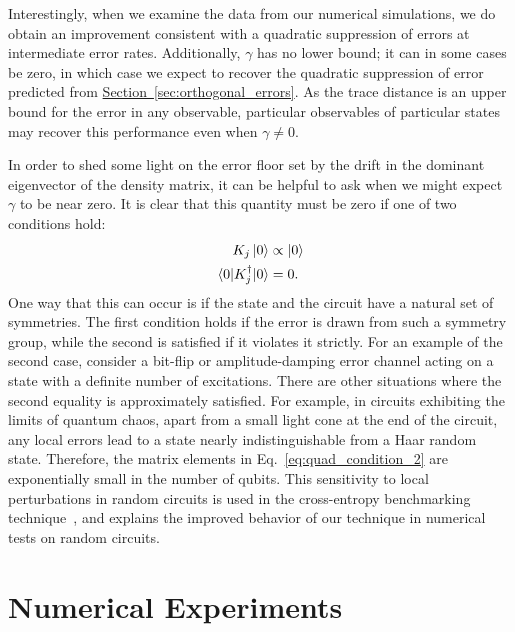 \documentclass[
amsmath,
amssymb,
aps,
pra,
reprint,
twocolumn,
superscriptaddress,
longbibliography,
showkeys,
floatfix
]{revtex4-1}
\newcommand{\replace}[2]{#2}
\def\ket#1{\ensuremath{\mathinner{|{#1}\rangle}}}
\renewcommand{\sec}[1]{\hyperref[sec:#1]{Section~\ref*{sec:#1}}}
\begin{document}
Interestingly, when we examine the data from our numerical simulations, we do
obtain an improvement consistent with a quadratic suppression of errors at
intermediate error rates.
Additionally, \(\gamma\) has no lower bound;
it can in some cases be zero, in which case we expect to recover the quadratic
suppression of error predicted from \sec{orthogonal_errors}.
As the trace distance is an upper bound for the error in any observable,
particular observables of particular states may recover this performance even
when \(\gamma \neq 0\).

In order to shed some light on the error floor set by the drift in the dominant eigenvector of the density matrix, it can be helpful to ask when we might expect \(\gamma\) to be near zero.
It is clear that this quantity must be zero if \replace{
\(K_j\ket{0} \propto \ket{0}\) or \(\ev{K_j^\dagger}{0} = 0\) for all \(j\).}{one of two conditions hold:}
\begin{align}
    K_j\ket{0} &\propto \ket{0}\label{eq:quad_condition_1}\\
    \ev{K_j^\dagger}{0} &= 0\label{eq:quad_condition_2}.
\end{align}
One way that this can occur is if the state and the circuit have a natural set of symmetries. The first condition holds if the error is drawn from such a symmetry group, while the second is satisfied if it violates it strictly.
For an example of the second case, consider a bit-flip or amplitude-damping error channel acting on a state
with a definite number of excitations. 
There are other situations where the second equality is approximately satisfied.  For example, in circuits
exhibiting the limits of quantum chaos, apart from a small light cone at the end of the circuit, any local errors lead to a state nearly indistinguishable from a Haar random state. Therefore, the matrix elements in \replace{the second condition}{Eq.~\ref{eq:quad_condition_2}} are exponentially small in the number of qubits.
This sensitivity to local perturbations in random circuits is used in the cross-entropy benchmarking technique~\cite{Arute2019-jy}, and explains the improved behavior of our technique in numerical tests on random circuits.


\section{Numerical Experiments}
\label{sec:numerical_performance}
\end{document}
